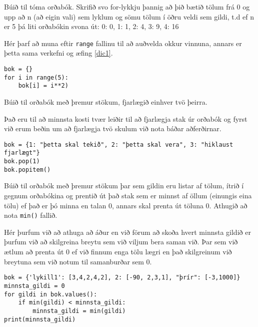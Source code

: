 \begin{exercise}\label{dic2}
Búið til tóma orðabók.
Skrifið svo for-lykkju þannig að þið bætið tölum frá 0 og upp að n (að eigin vali) sem lyklum og sömu tölum í öðru veldi sem gildi, t.d ef n er 5 þá liti orðabókin svona út:
{0: 0, 1: 1, 2: 4, 3: 9, 4: 16}
\end{exercise}
\begin{Answer}[ref={dic2}]
Hér þarf að muna eftir \texttt{range} fallinu til að auðvelda okkur vinnuna, annars er þetta sama verkefni og æfing \ref{dic1}.
\begin{lstlisting}
bok = {}
for i in range(5):
	bok[i] = i**2)\end{lstlisting}
\end{Answer}

\begin{exercise}\label{dic3}
Búið til orðabók með þremur stökum, fjarlægið einhver tvö þeirra.
\end{exercise}
\begin{Answer}[ref={dic3}]
Það eru til að minnsta kosti tvær leiðir til að fjarlægja stak úr orðabók og fyrst við erum beðin um að fjarlægja tvö skulum við nota báðar aðferðirnar.
	\begin{lstlisting}
bok = {1: "þetta skal tekið", 2: "þetta skal vera", 3: "hiklaust fjarlægt"}
bok.pop(1)
bok.popitem()\end{lstlisting}
\end{Answer}

\begin{exercise}\label{dic4}
	Búið til orðabók með þremur stökum þar sem gildin eru listar af tölum, ítrið í gegnum orðabókina og prentið út það stak sem er minnst af öllum (einungis eina tölu) ef það er þó minna en talan 0, annars skal prenta út töluna 0.
	Athugið að nota \texttt{min()} fallið.
\end{exercise}
\begin{Answer}[ref={dic4}]
Hér þurfum við að athuga að áður en við förum að skoða hvert minnsta gildið er þurfum við að skilgreina breytu sem við viljum bera saman við.
Þar sem við ætlum að prenta út 0 ef við finnum enga tölu lægri en það skilgreinum við breytuna sem við notum til samanburðar sem 0.
	\begin{lstlisting}
bok = {'lykill1': [3,4,2,4,2], 2: [-90, 2,3,1], "þrír": [-3,1000]}
minnsta_gildi = 0
for gildi in bok.values():
	if min(gildi) < minnsta_gildi:
		minnsta_gildi = min(gildi)
print(minnsta_gildi)\end{lstlisting}
\end{Answer}

